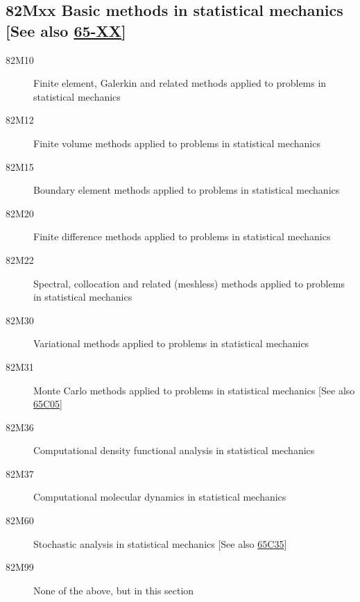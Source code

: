 \subsection*{82Mxx  Basic methods in statistical mechanics [See also \hyperref[65-XX]{65-XX}] }\label{82Mxx}
\begin{description}  
\item [82M10]\label{82M10} Finite element, Galerkin and related methods applied to problems in statistical mechanics
\item [82M12]\label{82M12} Finite volume methods applied to problems in statistical mechanics
\item [82M15]\label{82M15} Boundary element methods applied to problems in statistical mechanics
\item [82M20]\label{82M20} Finite difference methods applied to problems in statistical mechanics
\item [82M22]\label{82M22} Spectral, collocation and related (meshless) methods applied to problems in statistical mechanics
\item [82M30]\label{82M30} Variational methods applied to problems in statistical mechanics
\item [82M31]\label{82M31} Monte Carlo methods applied to problems in statistical mechanics [See also \hyperref[65C05]{65C05}]
\item [82M36]\label{82M36} Computational density functional analysis in statistical mechanics
\item [82M37]\label{82M37} Computational molecular dynamics in statistical mechanics
\item [82M60]\label{82M60} Stochastic analysis in statistical mechanics [See also \hyperref[65C35]{65C35}]
\item [82M99]\label{82M99} None of the above, but in this section
\end{description}
